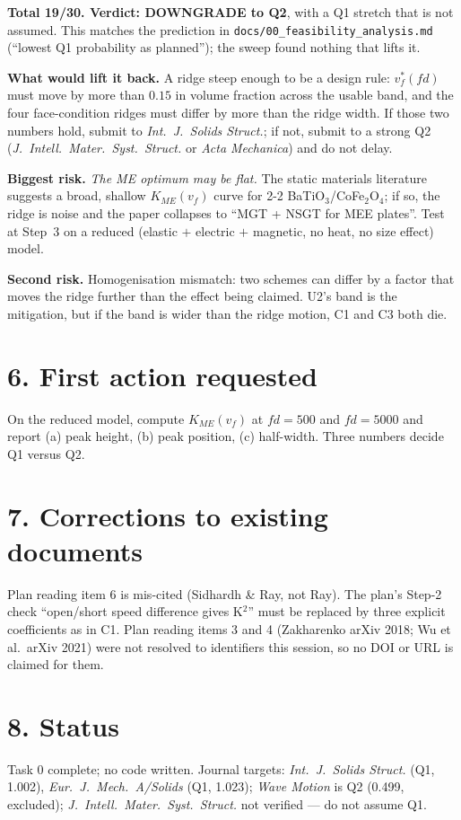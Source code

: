 \documentclass[11pt]{article}
\begin{document}
\textbf{Total 19/30. Verdict: DOWNGRADE to Q2}, with a Q1 stretch that is not assumed. This matches
the prediction in \texttt{docs/00\_feasibility\_analysis.md} (``lowest Q1 probability as planned'');
the sweep found nothing that lifts it.

\textbf{What would lift it back.} A ridge steep enough to be a design rule: $v_f^{*}(fd)$ must move by
more than $0.15$ in volume fraction across the usable band, and the four face-condition ridges must
differ by more than the ridge width. If those two numbers hold, submit to
\emph{Int.\ J.\ Solids Struct.}; if not, submit to a strong Q2 (\emph{J.\ Intell.\ Mater.\ Syst.\
Struct.} or \emph{Acta Mechanica}) and do not delay.

\textbf{Biggest risk.} \emph{The ME optimum may be flat.} The static materials literature suggests a
broad, shallow $K_{ME}(v_f)$ curve for 2-2 BaTiO$_3$/CoFe$_2$O$_4$; if so, the ridge is noise and the
paper collapses to ``MGT + NSGT for MEE plates''. Test at Step~3 on a reduced (elastic $+$ electric
$+$ magnetic, no heat, no size effect) model.

\textbf{Second risk.} Homogenisation mismatch: two schemes can differ by a factor that moves the ridge
further than the effect being claimed. U2's band is the mitigation, but if the band is wider than the
ridge motion, C1 and C3 both die.

\section*{6. First action requested}
On the reduced model, compute $K_{ME}(v_f)$ at $fd=500$ and $fd=5000$ and report (a) peak height,
(b) peak position, (c) half-width. Three numbers decide Q1 versus Q2.

\section*{7. Corrections to existing documents}
Plan reading item 6 is mis-cited (Sidhardh \& Ray, not Ray). The plan's Step-2 check ``open/short
speed difference gives K$^2$'' must be replaced by three explicit coefficients as in C1. Plan reading
items 3 and 4 (Zakharenko arXiv 2018; Wu et al.\ arXiv 2021) were not resolved to identifiers this
session, so no DOI or URL is claimed for them.

\section*{8. Status}
Task 0 complete; no code written. Journal targets: \emph{Int.\ J.\ Solids Struct.} (Q1, 1.002),
\emph{Eur.\ J.\ Mech.\ A/Solids} (Q1, 1.023); \emph{Wave Motion} is Q2 (0.499, excluded);
\emph{J.\ Intell.\ Mater.\ Syst.\ Struct.} not verified --- do not assume Q1.
\end{document}
